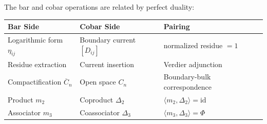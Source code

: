 \begin{theorem}\label{thm:verdier-duality-operations}
The bar and cobar operations are related by perfect duality:

\begin{center}
\begin{tabular}{|l|l|l|}
\hline
\textbf{Bar Side} & \textbf{Cobar Side} & \textbf{Pairing} \\
\hline
Logarithmic form $\eta_{ij}$ & Boundary current $[D_{ij}]$ & normalized residue $=1$ \\
Residue extraction & Current insertion & Verdier adjunction \\
Compactification $\overline{C}_n$ & Open space $C_n$ & Boundary-bulk correspondence \\
Product $m_2$ & Coproduct $\Delta_2$ & $\langle m_2, \Delta_2 \rangle = \mathrm{id}$ \\
Associator $m_3$ & Coassociator $\Delta_3$ & $\langle m_3, \Delta_3 \rangle = \Phi$ \\
\hline
\end{tabular}
\end{center}
\end{theorem}

